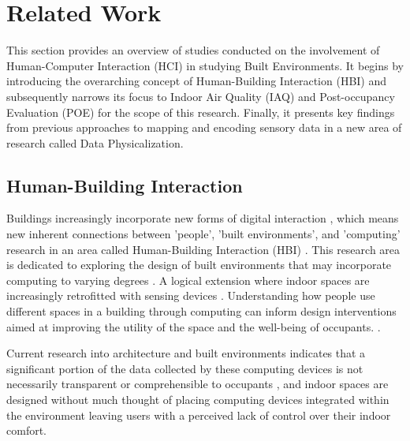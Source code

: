 \section{Related Work}
\label{sec:related_work}

This section provides an overview of studies conducted on the involvement of Human-Computer Interaction (HCI) in studying Built Environments. It begins by introducing the overarching concept of Human-Building Interaction (HBI) and subsequently narrows its focus to Indoor Air Quality (IAQ) and Post-occupancy Evaluation (POE) for the scope of this research. Finally, it presents key findings from previous approaches to mapping and encoding sensory data in a new area of research called Data Physicalization.

\subsection{Human-Building Interaction}

Buildings increasingly incorporate new forms of digital interaction \cite{pulsipher_towards_2023, margariti_understanding_2023}, which means new inherent connections between 'people', 'built environments', and 'computing' research in an area called Human-Building Interaction (HBI) \cite{alavi_introduction_2019, taherkhani_human-building_2023}. This research area is dedicated to exploring the design of built environments that may incorporate computing to varying degrees \cite{sowles_introducing_2021}.  A logical extension where indoor spaces are increasingly retrofitted with sensing devices \cite{pulsipher_towards_2023}. Understanding how people use different spaces in a building through computing can inform design interventions aimed at improving the utility of the space and the well-being of occupants. \cite{verma_studying_2017}. 

Current research into architecture and built environments indicates that a significant portion of the data collected by these computing devices is not necessarily transparent or comprehensible to occupants \cite{schnadelbach_adaptive_2019}, and indoor spaces are designed without much thought of placing computing devices integrated within the environment \cite{johansen_temporal_2019, kirsh_architects_2019} leaving users with a perceived lack of control over their indoor comfort. 

